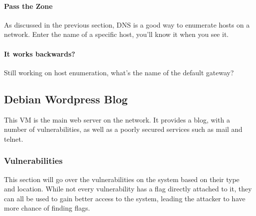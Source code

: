 				\paragraph{Pass the Zone}
					As discussed in the previous section, DNS is a good way to enumerate hosts on a network.
					Enter the name of a specific host, you'll know it when you see it.

				\paragraph{It works backwards?}
					Still working on host enumeration, what's the name of the default gateway?

		\subsection{Debian Wordpress Blog}
			This VM is the main web server on the network.
			It provides a blog, with a number of vulnerabilities, as well as a poorly secured services such as mail and telnet.


			\subsubsection{Vulnerabilities}
				This section will go over the vulnerabilities on the system based on their type and location.
				While not every vulnerability has a flag directly attached to it, they can all be used to gain better access to the system, leading the attacker to have more chance of finding flags.
